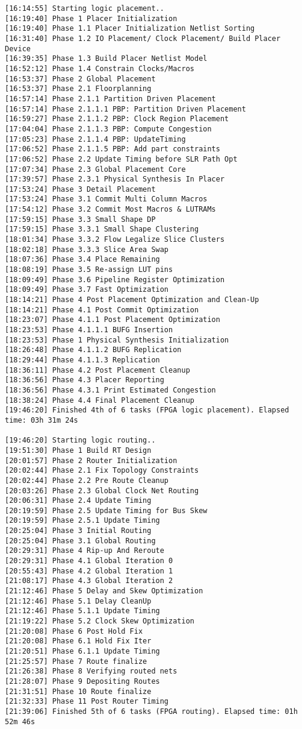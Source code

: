 \begin{lstlisting}[label=lst:lev_rec,caption=Содержимое log-файла]
[16:14:55] Starting logic placement..
[16:19:40] Phase 1 Placer Initialization
[16:19:40] Phase 1.1 Placer Initialization Netlist Sorting
[16:31:40] Phase 1.2 IO Placement/ Clock Placement/ Build Placer Device
[16:39:35] Phase 1.3 Build Placer Netlist Model
[16:52:12] Phase 1.4 Constrain Clocks/Macros
[16:53:37] Phase 2 Global Placement
[16:53:37] Phase 2.1 Floorplanning
[16:57:14] Phase 2.1.1 Partition Driven Placement
[16:57:14] Phase 2.1.1.1 PBP: Partition Driven Placement
[16:59:27] Phase 2.1.1.2 PBP: Clock Region Placement
[17:04:04] Phase 2.1.1.3 PBP: Compute Congestion
[17:05:23] Phase 2.1.1.4 PBP: UpdateTiming
[17:06:52] Phase 2.1.1.5 PBP: Add part constraints
[17:06:52] Phase 2.2 Update Timing before SLR Path Opt
[17:07:34] Phase 2.3 Global Placement Core
[17:39:57] Phase 2.3.1 Physical Synthesis In Placer
[17:53:24] Phase 3 Detail Placement
[17:53:24] Phase 3.1 Commit Multi Column Macros
[17:54:12] Phase 3.2 Commit Most Macros & LUTRAMs
[17:59:15] Phase 3.3 Small Shape DP
[17:59:15] Phase 3.3.1 Small Shape Clustering
[18:01:34] Phase 3.3.2 Flow Legalize Slice Clusters
[18:02:18] Phase 3.3.3 Slice Area Swap
[18:07:36] Phase 3.4 Place Remaining
[18:08:19] Phase 3.5 Re-assign LUT pins
[18:09:49] Phase 3.6 Pipeline Register Optimization
[18:09:49] Phase 3.7 Fast Optimization
[18:14:21] Phase 4 Post Placement Optimization and Clean-Up
[18:14:21] Phase 4.1 Post Commit Optimization
[18:23:07] Phase 4.1.1 Post Placement Optimization
[18:23:53] Phase 4.1.1.1 BUFG Insertion
[18:23:53] Phase 1 Physical Synthesis Initialization
[18:26:48] Phase 4.1.1.2 BUFG Replication
[18:29:44] Phase 4.1.1.3 Replication
[18:36:11] Phase 4.2 Post Placement Cleanup
[18:36:56] Phase 4.3 Placer Reporting
[18:36:56] Phase 4.3.1 Print Estimated Congestion
[18:38:24] Phase 4.4 Final Placement Cleanup
[19:46:20] Finished 4th of 6 tasks (FPGA logic placement). Elapsed time: 03h 31m 24s 

[19:46:20] Starting logic routing..
[19:51:30] Phase 1 Build RT Design
[20:01:57] Phase 2 Router Initialization
[20:02:44] Phase 2.1 Fix Topology Constraints
[20:02:44] Phase 2.2 Pre Route Cleanup
[20:03:26] Phase 2.3 Global Clock Net Routing
[20:06:31] Phase 2.4 Update Timing
[20:19:59] Phase 2.5 Update Timing for Bus Skew
[20:19:59] Phase 2.5.1 Update Timing
[20:25:04] Phase 3 Initial Routing
[20:25:04] Phase 3.1 Global Routing
[20:29:31] Phase 4 Rip-up And Reroute
[20:29:31] Phase 4.1 Global Iteration 0
[20:55:43] Phase 4.2 Global Iteration 1
[21:08:17] Phase 4.3 Global Iteration 2
[21:12:46] Phase 5 Delay and Skew Optimization
[21:12:46] Phase 5.1 Delay CleanUp
[21:12:46] Phase 5.1.1 Update Timing
[21:19:22] Phase 5.2 Clock Skew Optimization
[21:20:08] Phase 6 Post Hold Fix
[21:20:08] Phase 6.1 Hold Fix Iter
[21:20:51] Phase 6.1.1 Update Timing
[21:25:57] Phase 7 Route finalize
[21:26:38] Phase 8 Verifying routed nets
[21:28:07] Phase 9 Depositing Routes
[21:31:51] Phase 10 Route finalize
[21:32:33] Phase 11 Post Router Timing
[21:39:06] Finished 5th of 6 tasks (FPGA routing). Elapsed time: 01h 52m 46s 


\end{lstlisting}
